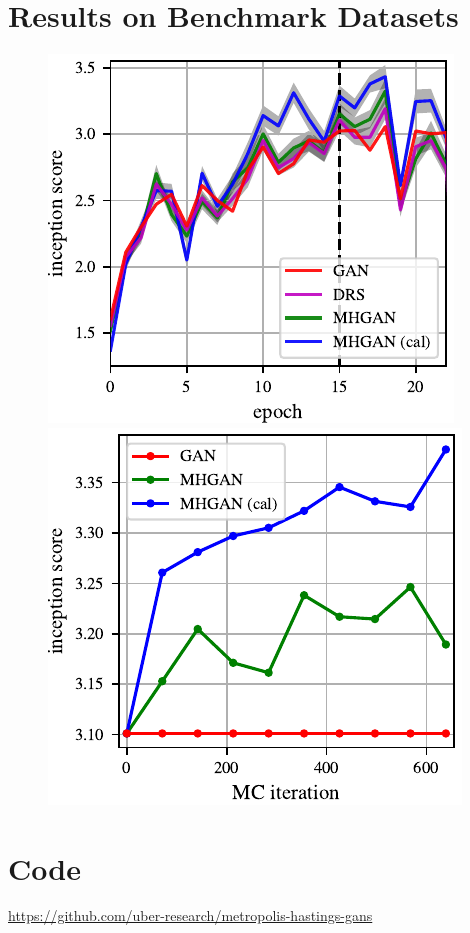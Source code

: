 \documentclass[a0,landscape]{a0poster}
\begin{document}
\begin{multicols}{3}
\section*{\fontsize{67.1}{82} \selectfont \color{NavyBlue} Results on Benchmark Datasets \color{Black}}
\begin{figure}[H]
\centering
\includegraphics[width=.1\textwidth]{../figures/per_epoch.pdf}
\includegraphics[width=.1\textwidth]{../figures/plot_per_mh.pdf}
\end{figure}



\section*{\fontsize{67.1}{82} \selectfont \color{NavyBlue} Code \color{Black}}
\centering
\large {\url{https://github.com/uber-research/metropolis-hastings-gans}}

\end{multicols}
\end{document}
